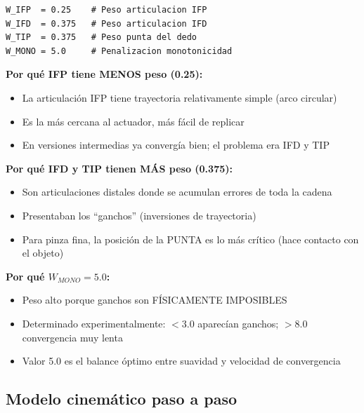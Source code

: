 \documentclass[11pt,letterpaper]{article}
\begin{document}
\begin{lstlisting}
W_IFP  = 0.25    # Peso articulacion IFP
W_IFD  = 0.375   # Peso articulacion IFD
W_TIP  = 0.375   # Peso punta del dedo
W_MONO = 5.0     # Penalizacion monotonicidad
\end{lstlisting}

\textbf{Por qu\'e IFP tiene MENOS peso (0.25):}
\begin{itemize}
\item La articulaci\'on IFP tiene trayectoria relativamente simple (arco circular)
\item Es la m\'as cercana al actuador, m\'as f\'acil de replicar
\item En versiones intermedias ya converg\'ia bien; el problema era IFD y TIP
\end{itemize}

\textbf{Por qu\'e IFD y TIP tienen M\'AS peso (0.375):}
\begin{itemize}
\item Son articulaciones distales donde se acumulan errores de toda la cadena
\item Presentaban los ``ganchos'' (inversiones de trayectoria)
\item Para pinza fina, la posici\'on de la PUNTA es lo m\'as cr\'itico (hace contacto con el objeto)
\end{itemize}

\textbf{Por qu\'e $W_{MONO} = 5.0$:}
\begin{itemize}
\item Peso alto porque ganchos son F\'ISICAMENTE IMPOSIBLES
\item Determinado experimentalmente: $< 3.0$ aparec\'ian ganchos; $> 8.0$ convergencia muy lenta
\item Valor 5.0 es el balance \'optimo entre suavidad y velocidad de convergencia
\end{itemize}

\subsection{Modelo cinem\'atico paso a paso}
\end{document}
